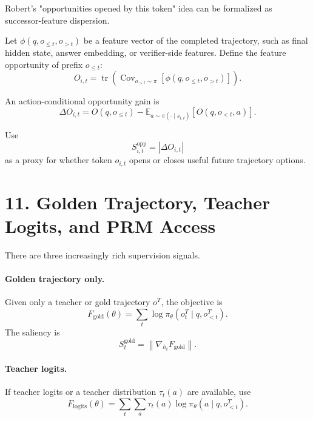\documentclass[11pt]{article}
\newcommand{\E}{\mathbb{E}}
\newcommand{\Cov}{\operatorname{Cov}}
\newcommand{\tr}{\operatorname{tr}}
\begin{document}
Robert's "opportunities opened by this token" idea can be formalized as
successor-feature dispersion.

Let $\phi(q,o_{\le t},o_{>t})$ be a feature vector of the completed trajectory,
such as final hidden state, answer embedding, or verifier-side features. Define
the feature opportunity of prefix $o_{\le t}$:
\begin{equation}
  O_{i,t}
  =
  \tr
  \left(
    \Cov_{o_{>t} \sim \pi}
    \left[
      \phi(q,o_{\le t},o_{>t})
    \right]
  \right).
\end{equation}

An action-conditional opportunity gain is
\begin{equation}
  \Delta O_{i,t}
  =
  O(q,o_{\le t})
  -
  \E_{a \sim \pi(\cdot \mid s_{i,t})}
  \left[
    O(q,o_{<t},a)
  \right].
\end{equation}

Use
\begin{equation}
  S^{\mathrm{opp}}_{i,t}
  =
  \left|\Delta O_{i,t}\right|
\end{equation}
as a proxy for whether token $o_{i,t}$ opens or closes useful future trajectory
options.

\section*{11. Golden Trajectory, Teacher Logits, and PRM Access}

There are three increasingly rich supervision signals.

\paragraph{Golden trajectory only.}
Given only a teacher or gold trajectory $o^T$, the objective is
\begin{equation}
  F_{\mathrm{gold}}(\theta)
  =
  \sum_{t}
  \log \pi_\theta(o^T_t \mid q,o^T_{<t}).
\end{equation}
The saliency is
\begin{equation}
  S^{\mathrm{gold}}_t
  =
  \left\|
    \nabla_{h_t} F_{\mathrm{gold}}
  \right\|.
\end{equation}

\paragraph{Teacher logits.}
If teacher logits or a teacher distribution $\tau_t(a)$ are available, use
\begin{equation}
  F_{\mathrm{logits}}(\theta)
  =
  \sum_t
  \sum_a
  \tau_t(a)
  \log \pi_\theta(a \mid q,o^T_{<t}).
\end{equation}
\end{document}
